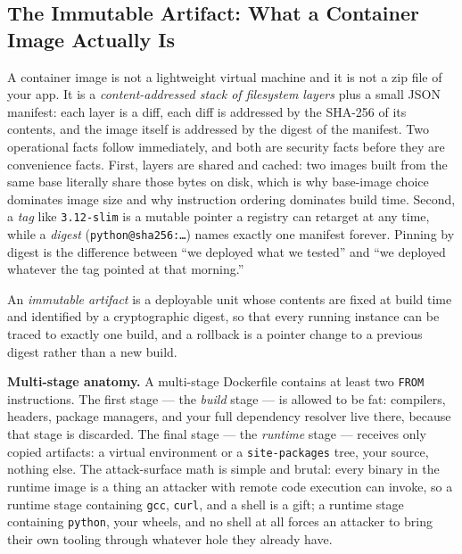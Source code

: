 \subsection{The Immutable Artifact: What a Container Image Actually Is}
\label{sec:ch17-image}

A container image is not a lightweight virtual machine and it is not a
zip file of your app. It is a \emph{content-addressed stack of filesystem
layers} plus a small JSON manifest: each layer is a diff, each diff is
addressed by the SHA-256 of its contents, and the image itself is
addressed by the digest of the manifest. Two operational facts follow
immediately, and both are security facts before they are convenience
facts. First, layers are shared and cached: two images built from the
same base literally share those bytes on disk, which is why base-image
choice dominates image size and why instruction ordering dominates build
time. Second, a \emph{tag} like \texttt{3.12-slim} is a mutable pointer a
registry can retarget at any time, while a \emph{digest}
(\texttt{python@sha256:\ldots}) names exactly one manifest forever.
Pinning by digest is the difference between ``we deployed what we
tested'' and ``we deployed whatever the tag pointed at that morning.''

\begin{definition}
An \emph{immutable artifact} is a deployable unit whose contents are fixed
at build time and identified by a cryptographic digest, so that every
running instance can be traced to exactly one build, and a rollback is a
pointer change to a previous digest rather than a new build.
\end{definition}

\textbf{Multi-stage anatomy.} A multi-stage Dockerfile contains at least
two \texttt{FROM} instructions. The first stage --- the \emph{build}
stage --- is allowed to be fat: compilers, headers, package managers, and
your full dependency resolver live there, because that stage is discarded.
The final stage --- the \emph{runtime} stage --- receives only copied
artifacts: a virtual environment or a \texttt{site-packages} tree, your
source, nothing else. The attack-surface math is simple and brutal: every
binary in the runtime image is a thing an attacker with remote code
execution can invoke, so a runtime stage containing \texttt{gcc},
\texttt{curl}, and a shell is a gift; a runtime stage containing
\texttt{python}, your wheels, and no shell at all forces an attacker to
bring their own tooling through whatever hole they already have.

